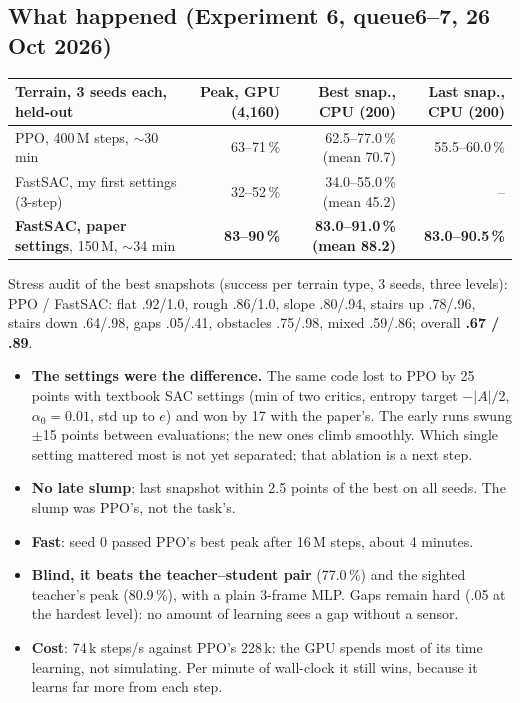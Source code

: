 \documentclass[10pt,letterpaper]{article}
\newcommand{\key}[1]{\textbf{#1}}
\begin{document}
\subsection{What happened (Experiment 6, queue6–7, 26 Oct 2026)}
\begin{small}
\begin{tabularx}{\linewidth}{@{}Xrrr@{}}
\toprule
Terrain, 3 seeds each, held-out & Peak, GPU (4{,}160) & Best snap., CPU (200) & Last snap., CPU (200) \\ \midrule
PPO, 400\,M steps, $\sim$30 min & 63–71\,\% & 62.5–77.0\,\% (mean 70.7) & 55.5–60.0\,\% \\
FastSAC, my first settings (3-step) & 32–52\,\% & 34.0–55.0\,\% (mean 45.2) & -- \\
\textbf{FastSAC, paper settings}, 150\,M, $\sim$34 min & \textbf{83–90\,\%} & \textbf{83.0–91.0\,\% (mean 88.2)} & \textbf{83.0–90.5\,\%} \\ \bottomrule
\end{tabularx}
\end{small}

Stress audit of the best snapshots (success per terrain type, 3 seeds, three levels): PPO / FastSAC: flat .92/1.0, rough .86/1.0,
slope .80/.94, stairs up .78/.96, stairs down .64/.98, gaps .05/.41, obstacles .75/.98, mixed .59/.86; overall \textbf{.67 / .89}.

\begin{itemize}
\item \key{The settings were the difference.} The same code lost to PPO by 25 points with textbook SAC settings (min of two critics,
entropy target $-|A|/2$, $\alpha_0=0.01$, std up to $e$) and won by 17 with the paper's. The early runs swung $\pm$15 points between
evaluations; the new ones climb smoothly. Which single setting mattered most is not yet separated; that ablation is a next step.
\item \key{No late slump}: last snapshot within 2.5 points of the best on all seeds. The slump was PPO's, not the task's.
\item \key{Fast}: seed 0 passed PPO's best peak after 16\,M steps, about 4 minutes.
\item \key{Blind, it beats the teacher–student pair} (77.0\,\%) and the sighted teacher's peak (80.9\,\%), with a plain 3-frame MLP.
Gaps remain hard (.05 at the hardest level): no amount of learning sees a gap without a sensor.
\item \key{Cost}: 74\,k steps/s against PPO's 228\,k: the GPU spends most of its time learning, not simulating. Per minute of
wall-clock it still wins, because it learns far more from each step.
\end{itemize}
\end{document}
